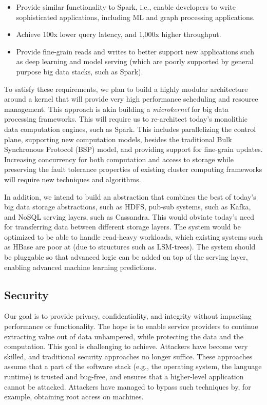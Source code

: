\begin{itemize}[noitemsep,topsep=0pt,parsep=0pt,partopsep=0pt]
\item Provide similar functionality to Spark, i.e., enable developers to write sophisticated applications, including ML and graph processing applications.
\item Achieve 100x lower query latency, and 1,000x higher throughput.
\item Provide fine-grain reads and writes to better support new applications such as deep learning and model serving (which are poorly supported by general purpose big data stacks, such as Spark).
\end{itemize}

To satisfy these requirements, we plan to build a highly modular architecture around a kernel that will provide very high performance scheduling and resource management. This approach is akin building a {\em microkernel} for big data processing frameworks. This will require us to re-architect today's monolithic data computation engines, such as Spark. This includes parallelizing the control plane, supporting new computation models, besides the traditional Bulk Synchronous Protocol (BSP) model, and providing support for fine-grain updates. Increasing concurrency for both computation and access to storage while preserving the fault tolerance properties of existing cluster computing frameworks will require new techniques and algorithms. 

In addition, we intend to build an abstraction that combines the best of today's big data storage abstractions, such as HDFS, pub-sub systems, such as Kafka, and NoSQL serving layers, such as Cassandra. This would obviate today's need for transferring data between different storage layers. The system would be optimized to be able to handle read-heavy workloads, which existing systems such as HBase are poor at (due to structures such as LSM-trees). The system should be pluggable so that advanced logic can be added on top of the serving layer, enabling advanced machine learning predictions. 

\subsection{Security} 

Our goal is to provide privacy, confidentiality, and integrity without impacting performance or functionality. The hope is to enable service providers to continue extracting value out of data unhampered, while protecting the data and the computation. This goal is challenging to achieve. Attackers have become very skilled, and traditional security approaches no longer suffice. These approaches assume that a part of the software stack (e.g., the operating system, the language runtime) is trusted and bug-free, and ensures that a higher-level application cannot be attacked. Attackers have managed to bypass such techniques by, for example, obtaining root access on machines.

